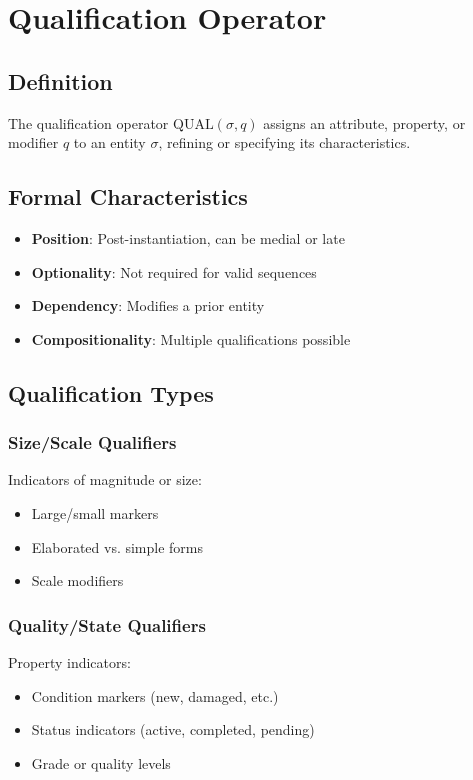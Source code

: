 \section{Qualification Operator}

\subsection{Definition}

The qualification operator $\text{QUAL}(\sigma, q)$ assigns an attribute, property, or modifier $q$ to an entity $\sigma$, refining or specifying its characteristics.

\subsection{Formal Characteristics}

\begin{itemize}
    \item \textbf{Position}: Post-instantiation, can be medial or late
    \item \textbf{Optionality}: Not required for valid sequences
    \item \textbf{Dependency}: Modifies a prior entity
    \item \textbf{Compositionality}: Multiple qualifications possible
\end{itemize}

\subsection{Qualification Types}

\subsubsection{Size/Scale Qualifiers}
Indicators of magnitude or size:
\begin{itemize}
    \item Large/small markers
    \item Elaborated vs. simple forms
    \item Scale modifiers
\end{itemize}

\subsubsection{Quality/State Qualifiers}
Property indicators:
\begin{itemize}
    \item Condition markers (new, damaged, etc.)
    \item Status indicators (active, completed, pending)
    \item Grade or quality levels
\end{itemize}

